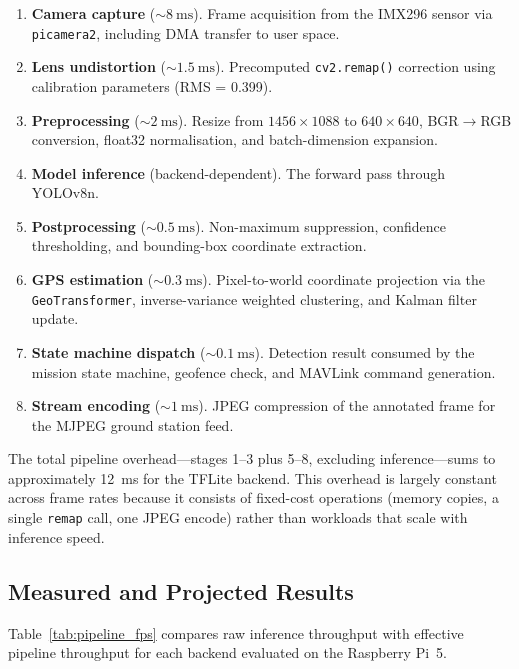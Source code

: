 \begin{enumerate}
  \item \textbf{Camera capture} (${\sim}\SI{8}{\milli\second}$).  Frame acquisition from the IMX296 sensor via \texttt{picamera2}, including DMA transfer to user space.
  \item \textbf{Lens undistortion} (${\sim}\SI{1.5}{\milli\second}$).  Precomputed \texttt{cv2.remap()} correction using calibration parameters (RMS = 0.399).
  \item \textbf{Preprocessing} (${\sim}\SI{2}{\milli\second}$).  Resize from $1456 \times 1088$ to $640 \times 640$, BGR$\to$RGB conversion, float32 normalisation, and batch-dimension expansion.
  \item \textbf{Model inference} (backend-dependent).  The forward pass through YOLOv8n.
  \item \textbf{Postprocessing} (${\sim}\SI{0.5}{\milli\second}$).  Non-maximum suppression, confidence thresholding, and bounding-box coordinate extraction.
  \item \textbf{GPS estimation} (${\sim}\SI{0.3}{\milli\second}$).  Pixel-to-world coordinate projection via the \texttt{GeoTransformer}, inverse-variance weighted clustering, and Kalman filter update.
  \item \textbf{State machine dispatch} (${\sim}\SI{0.1}{\milli\second}$).  Detection result consumed by the mission state machine, geofence check, and MAVLink command generation.
  \item \textbf{Stream encoding} (${\sim}\SI{1}{\milli\second}$).  JPEG compression of the annotated frame for the MJPEG ground station feed.
\end{enumerate}

\noindent The total pipeline overhead---stages 1--3 plus 5--8, excluding inference---sums to approximately \SI{12}{\milli\second} for the TFLite backend.  This overhead is largely constant across frame rates because it consists of fixed-cost operations (memory copies, a single \texttt{remap} call, one JPEG encode) rather than workloads that scale with inference speed.

\subsection{Measured and Projected Results}\label{sec:cv:pipeline-fps:results}

Table~\ref{tab:pipeline_fps} compares raw inference throughput with effective pipeline throughput for each backend evaluated on the Raspberry Pi~5.

